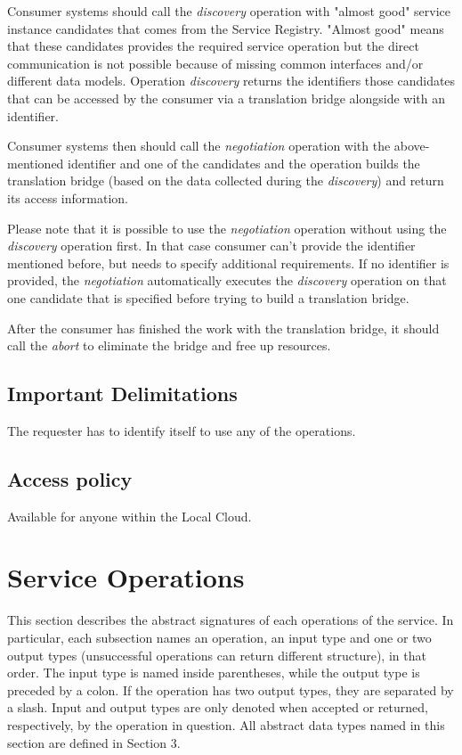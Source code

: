 \documentclass[a4paper]{arrowhead}
\begin{document}
Consumer systems should call the \textit{discovery} operation with "almost good" service instance candidates that comes from the Service Registry. "Almost good" means that these candidates provides the required service operation but the direct communication is not possible because of missing common interfaces and/or different data models. Operation \textit{discovery} returns the identifiers those candidates that can be accessed by the consumer via a translation bridge alongside with an identifier.

Consumer systems then should call the \textit{negotiation} operation with the above-mentioned identifier and one of the candidates and the operation builds the translation bridge (based on the data collected during the \textit{discovery}) and return its access information.

Please note that it is possible to use the \textit{negotiation} operation without using the \textit{discovery} operation first. In that case consumer can't provide the identifier mentioned before, but needs to specify additional requirements. If no identifier is provided, the \textit{negotiation} automatically executes the \textit{discovery} operation on that one candidate that is specified before trying to build a translation bridge.

After the consumer has finished the work with the translation bridge, it should call the \textit{abort} to eliminate the bridge and free up resources.

\subsection{Important Delimitations}
\label{sec:delimitations}

The requester has to identify itself to use any of the operations.

\subsection{Access policy}
\label{sec:accesspolicy}

Available for anyone within the Local Cloud.

\newpage

\section{Service Operations}
\label{sec:functions}

This section describes the abstract signatures of each operations of the service. In particular, each subsection names an operation, an input type and one or two output types (unsuccessful operations can return different structure), in that order.
The input type is named inside parentheses, while the output type is preceded by a colon. If the operation has two output types, they are separated by a slash.
Input and output types are only denoted when accepted or returned, respectively, by the operation in question. All abstract data types named in this section are defined in Section 3.
\end{document}
